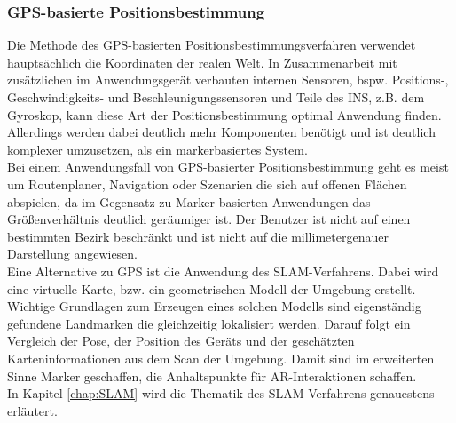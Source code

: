 \subsubsection*{\acs{GPS}-basierte Positionsbestimmung}
Die Methode des \acs{GPS}-basierten Positionsbestimmungsverfahren verwendet hauptsächlich die Koordinaten der realen Welt. In Zusammenarbeit 
mit zusätzlichen im Anwendungsgerät verbauten internen Sensoren, bspw. Positions-, Geschwindigkeits- und Beschleunigungssensoren und Teile des 
\ac{INS}, z.B. dem Gyroskop, kann diese Art der Positionsbestimmung optimal Anwendung finden. Allerdings werden dabei deutlich mehr Komponenten
benötigt und ist deutlich komplexer umzusetzen, als ein markerbasiertes System. 
\\ 
Bei einem Anwendungsfall von \acs{GPS}-basierter Positionsbestimmung geht es meist um Routenplaner, Navigation oder Szenarien die sich 
auf offenen Flächen abspielen, da im Gegensatz zu Marker-basierten Anwendungen das Größenverhältnis deutlich geräumiger ist. Der Benutzer ist 
nicht auf einen bestimmten Bezirk beschränkt und ist nicht auf die millimetergenauer Darstellung angewiesen.
\\ 
\linebreak
Eine Alternative zu \acs{GPS} ist die Anwendung des \acs{SLAM}-Verfahrens. Dabei wird eine virtuelle Karte, bzw. ein geometrischen Modell der 
Umgebung erstellt. Wichtige Grundlagen zum Erzeugen eines solchen Modells sind eigenständig gefundene Landmarken die gleichzeitig 
lokalisiert werden. Darauf folgt ein Vergleich der Pose, der Position des Geräts und der geschätzten Karteninformationen aus dem Scan der 
Umgebung. 
Damit sind im erweiterten Sinne Marker geschaffen, die Anhaltspunkte für \acl{AR}-Interaktionen schaffen.
\\ 
In Kapitel \ref{chap:SLAM} wird die Thematik des \acs{SLAM}-Verfahrens genauestens erläutert. 

